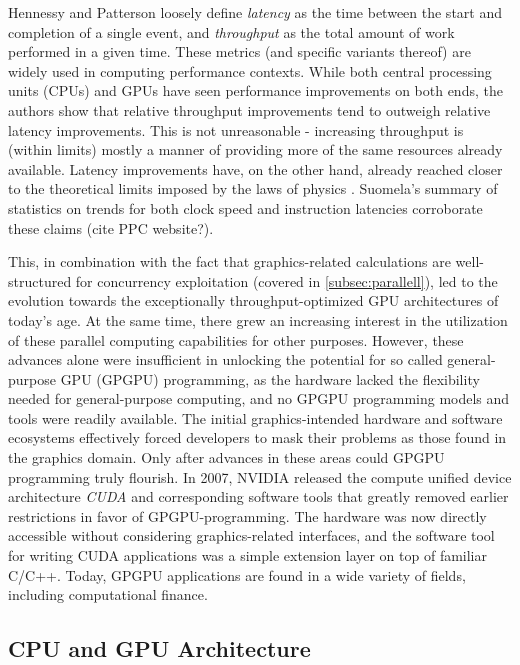 \documentclass[english,12pt,a4paper,pdftex,sci,utf8]{aaltothesis}
\begin{document}
Hennessy and Patterson \cite{hennessy2011computer} loosely define \emph{latency} as the time between the start and completion of a single event, and \emph{throughput} as the total amount of work performed in a given time. These metrics (and specific variants thereof) are widely used in computing performance contexts. While both central processing units (CPUs) and GPUs have seen performance improvements on both ends, the authors show that relative throughput improvements tend to outweigh relative latency improvements. This is not unreasonable - increasing throughput is (within limits) mostly a manner of providing more of the same resources already available. Latency improvements have, on the other hand, already reached closer to the theoretical limits imposed by the laws of physics \cite{hennessy2011computer} \cite{sanders2010cuda}. Suomela's summary of statistics on trends for both clock speed and instruction latencies corroborate these claims (cite PPC website?).

This, in combination with the fact that graphics-related calculations are well-structured for concurrency exploitation (covered in \cref{subsec:parallell}), led to the evolution towards the exceptionally throughput-optimized GPU architectures of today's age. At the same time, there grew an increasing interest in the utilization of these parallel computing capabilities for other purposes. However, these advances alone were insufficient in unlocking the potential for so called general-purpose GPU (GPGPU) programming, as the hardware lacked the flexibility needed for general-purpose computing, and no GPGPU programming models and tools were readily available. The initial graphics-intended hardware and software ecosystems effectively forced developers to mask their problems as those found in the graphics domain. Only after advances in these areas could GPGPU programming truly flourish. In 2007, NVIDIA released the compute unified device architecture \emph{CUDA} and corresponding software tools that greatly removed earlier restrictions in favor of GPGPU-programming. The hardware was now directly accessible without considering graphics-related interfaces, and the software tool for writing CUDA applications was a simple extension layer on top of familiar C/C++. Today, GPGPU applications are found in a wide variety of fields, including computational finance. \cite{sanders2010cuda} \cite{kirk2016programming}

\subsection{CPU and GPU Architecture}
\end{document}
